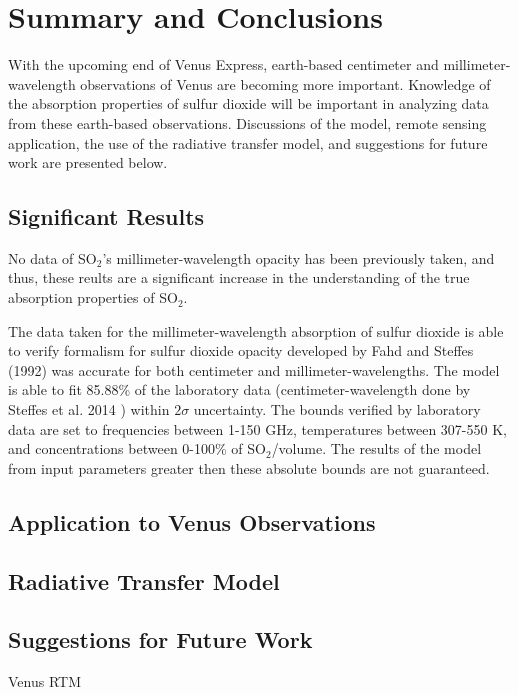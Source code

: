 \chapter{Summary and Conclusions}
With the upcoming end of Venus Express, earth-based centimeter and millimeter-wavelength observations of Venus are becoming more important. Knowledge of the absorption properties of sulfur dioxide will be important in analyzing data from these earth-based observations. Discussions of the model, remote sensing application, the use of the radiative transfer model, and suggestions for future work are presented below.
\section{Significant Results}
No data of SO$_2$'s millimeter-wavelength opacity has been previously taken, and thus, these reults are a significant increase in the understanding of the true absorption properties of SO$_2$.

The data taken for the millimeter-wavelength absorption of sulfur dioxide is able to verify formalism for sulfur dioxide opacity developed by Fahd and Steffes (1992) \cite{Fahd-1992} was accurate for both centimeter and millimeter-wavelengths. The model is able to fit 85.88\% of the laboratory data (centimeter-wavelength done by Steffes et al. 2014 \cite{Steffes-2014}) within $2\sigma$ uncertainty. The bounds verified by laboratory data are set to frequencies between 1-150 GHz, temperatures between 307-550 K, and concentrations between 0-100\% of SO$_2$/volume. The results of the model from input parameters greater then these absolute bounds are not guaranteed.
\section{Application to Venus Observations}
\section{Radiative Transfer Model}
\section{Suggestions for Future Work}
Venus RTM